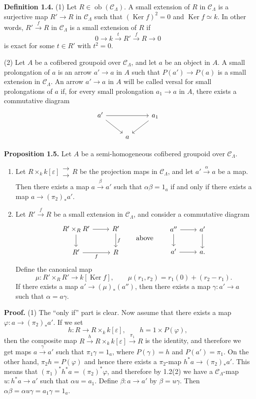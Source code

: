 \documentclass[11pt]{article}
\providecommand{\Ker}{\operatorname{Ker}}
\providecommand{\ob}{\operatorname{ob}}
\providecommand{\CL}{\mathcal C_\Lambda}
\begin{document}
\textbf{Definition 1.4.} (1) Let $R\in\ob(\CL)$. A small extension of $R$ in $\CL$ is a surjective map $R'\to R$ in $\CL$ such that $(\Ker f)^2=0$ and $\Ker f\simeq k$. In other words, $R'\xrightarrow{f}R$ in $\CL$ is a small extension of $R$ if
\[
 0\longrightarrow k\xrightarrow{t}R'\xrightarrow{f}R\longrightarrow0
\]
is exact for some $t\in R'$ with $t^2=0$.

(2) Let $A$ be a cofibered groupoid over $\CL$, and let $a$ be an object in $A$. A small prolongation of $a$ is an arrow $a'\to a$ in $A$ such that $P(a')\to P(a)$ is a small extension in $\CL$. An arrow $a'\to a$ in $A$ will be called versal for small prolongations of $a$ if, for every small prolongation $a_1\to a$ in $A$, there exists a commutative diagram
\[
\begin{tikzcd}
 a' \arrow[rr] \arrow[dr] && a_1 \arrow[dl]\\
& a &
\end{tikzcd}
\]

\textbf{Proposition 1.5.} Let $A$ be a semi-homogeneous cofibered groupoid over $\CL$.

\begin{enumerate}[label=(\arabic*)]
\item Let $R\times_k k[\varepsilon]\mathrel{\substack{\longrightarrow\\[-.6ex]\longrightarrow}} R$ be the projection maps in $\CL$, and let $a'\xrightarrow{\alpha}a$ be a map. Then there exists a map $a\xrightarrow{\beta}a'$ such that $\alpha\beta=1_a$ if and only if there exists a map $a\to(\pi_2)_*a'$.

\item Let $R'\xrightarrow{f}R$ be a small extension in $\CL$, and consider a commutative diagram
\[
\begin{tikzcd}
 R'\times_R R' \arrow[r] \arrow[d] & R' \arrow[d,"f"]\\
 R' \arrow[r,"f"'] & R
\end{tikzcd}
\qquad\text{above}\qquad
\begin{tikzcd}
 a'' \arrow[r] \arrow[d] & a' \arrow[d]\\
 a' \arrow[r] & a .
\end{tikzcd}
\]
Define the canonical map
\[
 \mu:R'\times_R R'\longrightarrow k[\Ker f],\qquad
 \mu(r_1,r_2)=r_1(0)+(r_2-r_1).
\]
If there exists a map $a'\to(\mu)_*(a'')$, then there exists a map $\gamma:a'\to a$ such that $\alpha=a\gamma$.
\end{enumerate}

\textbf{Proof.} (1) The ``only if'' part is clear. Now assume that there exists a map $\varphi:a\to(\pi_2)_*a'$. If we set
\[
 h:R\longrightarrow R\times_k k[\varepsilon],\qquad h=1\times P(\varphi),
\]
then the composite map $R\xrightarrow{h}R\times_k k[\varepsilon]\xrightarrow{\pi_1}R$ is the identity, and therefore we get maps $a\xrightarrow{\gamma}a'$ such that $\pi_1\gamma=1_a$, where $P(\gamma)=h$ and $P(a')=\pi_1$. On the other hand, $\pi_2h=P(\varphi)$ and hence there exists a $\pi_2$-map $h^*a\to(\pi_2)_*a'$. This means that $(\pi_1)^*h^*a=(\pi_2)^*\varphi$, and therefore by 1.2(2) we have a $\CL$-map $u:h^*a\to a'$ such that $\alpha u=a_1$. Define $\beta:a\to a'$ by $\beta=u\gamma$. Then $\alpha\beta=\alpha u\gamma=a_1\gamma=1_a$.
\end{document}
